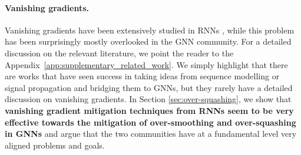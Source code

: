 \vspace{-0.3cm}
\paragraph{Vanishing gradients.}
Vanishing gradients have been extensively studied in RNNs \cite{bengio1994learning, hochreiter1997long, pascanu2013difficulty}, while this problem has been surprisingly mostly overlooked in the GNN community. For a detailed discussion on the relevant literature, we point the reader to the Appendix~\ref{app:supplementary_related_work}. We simply highlight that there are works that have seen success in taking ideas from sequence modelling \cite{rusch2022graph, gravina2022anti,rusch2023gradient, wang2024mamba,behrouz2024graphmamba, kiani2024unitary} or signal propagation \cite{epping2024graph, scholkemper2024residual} and bridging them to GNNs, but they rarely have a detailed discussion on vanishing gradients. In Section \ref{sec:over-squashing}, we show that \textbf{vanishing gradient mitigation techniques from RNNs seem to be very effective towards the mitigation of over-smoothing and over-squashing in GNNs} and argue that the two communities have at a fundamental level very aligned problems and goals.

\vspace{-0.2cm}